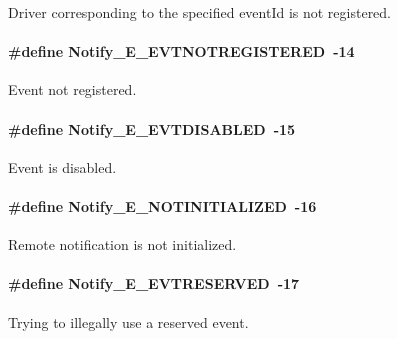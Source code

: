 Driver corresponding to the specified eventId is not registered. 

\paragraph[{Notify\_\-E\_\-EVTNOTREGISTERED}]{\setlength{\rightskip}{0pt plus 5cm}\#define Notify\_\-E\_\-EVTNOTREGISTERED~-\/14}\hfill\label{_notify_8h_ad9030d9269afff260cba4971288ea06d}


Event not registered. 

\paragraph[{Notify\_\-E\_\-EVTDISABLED}]{\setlength{\rightskip}{0pt plus 5cm}\#define Notify\_\-E\_\-EVTDISABLED~-\/15}\hfill\label{_notify_8h_a5f7397fead455e8973aff576329edeec}


Event is disabled. 

\paragraph[{Notify\_\-E\_\-NOTINITIALIZED}]{\setlength{\rightskip}{0pt plus 5cm}\#define Notify\_\-E\_\-NOTINITIALIZED~-\/16}\hfill\label{_notify_8h_a78efd69afedc82d2912adb9f668c2c54}


Remote notification is not initialized. 

\paragraph[{Notify\_\-E\_\-EVTRESERVED}]{\setlength{\rightskip}{0pt plus 5cm}\#define Notify\_\-E\_\-EVTRESERVED~-\/17}\hfill\label{_notify_8h_a68460eb33839572c7416387b91e33e68}


Trying to illegally use a reserved event. 

